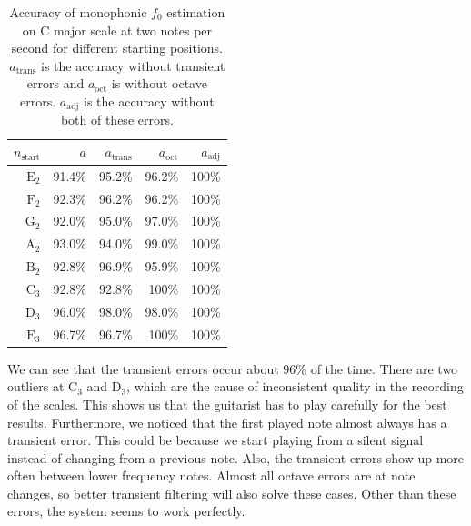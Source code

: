 \documentclass[10pt,twocolumn]{article}
\begin{document}
\begin{table}[H]\vspace{-3mm}
    \centering
    \begin{tabular}{r|rrrr}
        $n_\text{start}$ & $a$ & $a_\text{trans}$ & $a_\text{oct}$ & $a_\text{adj}$ \\
        \hline
        $\text{E}_2$ & 91.4\% & 95.2\% & 96.2\% & 100\% \\
        $\text{F}_2$ & 92.3\% & 96.2\% & 96.2\% & 100\% \\
        $\text{G}_2$ & 92.0\% & 95.0\% & 97.0\% & 100\% \\
        $\text{A}_2$ & 93.0\% & 94.0\% & 99.0\% & 100\% \\
        $\text{B}_2$ & 92.8\% & 96.9\% & 95.9\% & 100\% \\
        $\text{C}_3$ & 92.8\% & 92.8\% & 100\%  & 100\% \\
        $\text{D}_3$ & 96.0\% & 98.0\% & 98.0\% & 100\% \\
        $\text{E}_3$ & 96.7\% & 96.7\% & 100\%  & 100\%
    \end{tabular}
    \caption{Accuracy of monophonic $f_0$ estimation on C major scale at two notes per second for different starting positions. $a_\text{trans}$ is the accuracy without transient errors and $a_\text{oct}$ is without octave errors. $a_\text{adj}$ is the accuracy without both of these errors.}
    \label{tab:monperf}
\end{table}\vspace{-3mm}
We can see that the transient errors occur about 96\% of the time. There are two outliers at $\text{C}_3$ and $\text{D}_3$, which are the cause of inconsistent quality in the recording of the scales. This shows us that the guitarist has to play carefully for the best results. Furthermore, we noticed that the first played note almost always has a transient error. This could be because we start playing from a silent signal instead of changing from a previous note. Also, the transient errors show up more often between lower frequency notes. Almost all octave errors are at note changes, so better transient filtering will also solve these cases. Other than these errors, the system seems to work perfectly.
\end{document}

